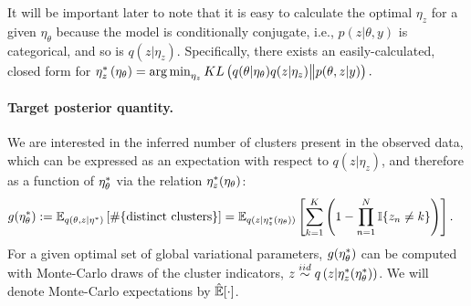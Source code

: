 It will be important later to note that it is easy to calculate the optimal
$\eta_z$ for a given $\eta_\theta$ because the model is conditionally conjugate,
i.e., $p\left(z \vert \theta, y\right)$ is categorical, and so is $q\left(z
\vert \eta_z\right)$.  Specifically, there exists an easily-calculated, closed
form for
%
$
\eta_z^{*}\left(\eta_\theta\right) = \operatorname*{arg\,min}_{\eta_z}
    KL\left(
    q(\theta \vert \eta_\theta) q( z \vert \eta_z)
        \big\| p(\theta, z | y)
    \right).
$
%



\paragraph{Target posterior quantity.}

We are interested in the inferred number of clusters present in the observed
data, which can be expressed as an expectation with respect to
$q\left(z \vert \eta_z \right)$, and therefore as a function of
$\eta_\theta^{*}$ via the relation $\eta_z^{*}(\eta_\theta)$:
%
\begin{align}
g(\eta_\theta^{*}) &:=
\mathbb{E}_{q(\theta, z \vert \eta^{*})} \left[ \#\{\text{distinct clusters}\} \right]  =
\mathbb{E}_{q(z \vert \eta_z^{*}(\eta_\theta))} \left[
    \sum_{k=1}^K \left(1 - \prod_{n=1}^N \mathbb{I}\{z_n \ne k\} \right) \right].
    \label{eq:expected_num_clusters}
\end{align}
%
For a given optimal set of global variational parameters, $g(\eta_\theta^{*})$ can
be computed with Monte-Carlo draws of the cluster indicators, $z \stackrel{iid}{\sim} q\left(z
\vert \eta_z^{*}(\eta_\theta^{*})\right)$.  We will denote Monte-Carlo expectations
by $\hat{\mathbb{E}}[\cdot]$.
